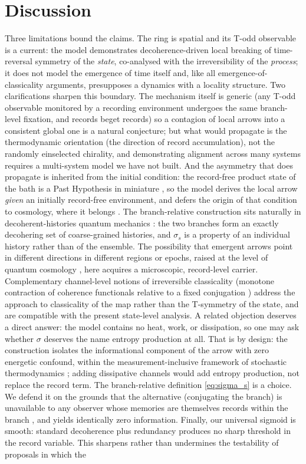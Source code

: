 \documentclass[11pt]{article}
\begin{document}
\section{Discussion}\label{sec:discussion}

Three limitations bound the claims. The ring is spatial and its T-odd observable is a current: the model demonstrates decoherence-driven local breaking of time-reversal symmetry of the \emph{state}, co-analysed with the irreversibility of the \emph{process}; it does not model the emergence of time itself and, like all emergence-of-classicality arguments, presupposes a dynamics with a locality structure. Two clarifications sharpen this boundary. The mechanism itself is generic (any T-odd observable monitored by a recording environment undergoes the same branch-level fixation, and records beget records) so a contagion of local arrows into a consistent global one is a natural conjecture; but what would propagate is the thermodynamic orientation (the direction of record accumulation), not the randomly einselected chirality, and demonstrating alignment across many systems requires a multi-system model we have not built. And the asymmetry that does propagate is inherited from the initial condition: the record-free product state of the bath is a Past Hypothesis in miniature \cite{Chen2024}, so the model derives the local arrow \emph{given} an initially record-free environment, and defers the origin of that condition to cosmology, where it belongs \cite{Halliwell1994}. The branch-relative construction sits naturally in decoherent-histories quantum mechanics \cite{GellMann1993}: the two branches form an exactly decohering set of coarse-grained histories, and $\sigma_s$ is a property of an individual history rather than of the ensemble. The possibility that emergent arrows point in different directions in different regions or epochs, raised at the level of quantum cosmology \cite{Hartle2013}, here acquires a microscopic, record-level carrier. Complementary channel-level notions of irreversible classicality (monotone contraction of coherence functionals relative to a fixed conjugation \cite{Gil2026}) address the approach to classicality of the map rather than the T-symmetry of the state, and are compatible with the present state-level analysis. A related objection deserves a direct answer: the model contains no heat, work, or dissipation, so one may ask whether $\sigma$ deserves the name entropy production at all. That is by design: the construction isolates the informational component of the arrow with zero energetic confound, within the measurement-inclusive framework of stochastic thermodynamics \cite{Landi2021}; adding dissipative channels would add entropy production, not replace the record term. The branch-relative definition \eqref{eq:sigma_s} is a choice. We defend it on the grounds that the alternative (conjugating the branch) is unavailable to any observer whose memories are themselves records within the branch \cite{Mlodinow2014}, and yields identically zero information. Finally, our universal sigmoid is smooth: standard decoherence plus redundancy produces no sharp threshold in the record variable. This sharpens rather than undermines the testability of proposals in which the 
\end{document}
